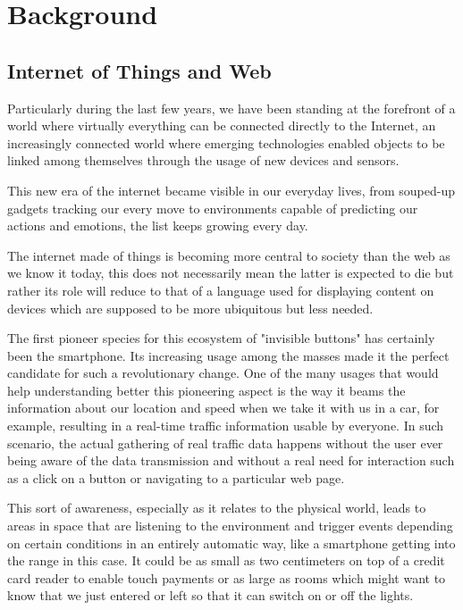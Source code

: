 \chead{}
\chapter{Background}

\section{Internet of Things and Web}
  
Particularly during the last few years, we have been standing at the forefront of a world where virtually everything can be connected directly to the Internet, an increasingly connected world where emerging technologies enabled objects to be linked among themselves through the usage of new devices and sensors.

This new era of the internet became visible in our everyday lives, from souped-up gadgets tracking our every move to environments capable of predicting our actions and emotions, the list keeps growing every day.


The internet made of things is becoming more central to society than the web as we know it today, this does not necessarily mean the latter is expected to die but rather its role will reduce to that of a language used for displaying content on devices which are supposed to be more ubiquitous but less needed.

The first pioneer species for this ecosystem of "invisible buttons" has certainly been the smartphone. Its increasing usage among the masses made it the perfect candidate for such a revolutionary change. One of the many usages that would help understanding better this pioneering aspect is the way it beams the information about our location and speed when we take it with us in a car, for example, resulting in a real-time traffic information usable by everyone. In such scenario, the actual gathering of real traffic data happens without the user ever being aware of the data transmission and without a real need for interaction such as a click on a button or navigating to a particular web page.

This sort of awareness, especially as it relates to the physical world, leads to areas in space that are listening to the environment and trigger events depending on certain conditions in an entirely automatic way, like a smartphone getting into the range in this case. It could be as small as two centimeters on top of a credit card reader to enable touch payments or as large as rooms which might want to know that we just entered or left so that it can switch on or off the lights.

